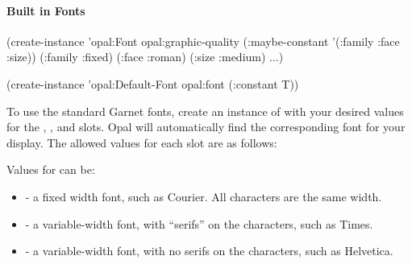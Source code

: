 \paragraph{Built in Fonts}

\begin{programexample}
(create-instance 'opal:Font opal:graphic-quality
  (:maybe-constant '(:family :face :size))
  (:family :fixed)
  (:face :roman)
  (:size :medium)
   ...)

(create-instance 'opal:Default-Font opal:font
   (:constant T))
\end{programexample}

To use the standard Garnet fonts, create an instance of  with
your desired values for the , , and  slots.
Opal will automatically find the corresponding font for your display.  The
allowed values for each slot are as follows:

  

Values for  can be:
\begin{itemize}
\item {} - a fixed width font, such as Courier.  All characters are the
same width.

\item {} - a variable-width font, with ``serifs'' on the characters,
such as Times.

\item {} - a variable-width font, with no serifs on the characters,
such as Helvetica.
\end{itemize}

